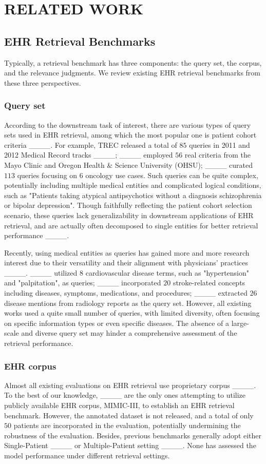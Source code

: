 \section{RELATED WORK}
\subsection{EHR Retrieval Benchmarks}
Typically, a retrieval benchmark has three components: the query set, the corpus, and the relevance judgments.
We review existing EHR retrieval benchmarks from these three perspectives.

\subsubsection{Query set}
According to the downstream task of interest, there are various types of query sets used in EHR retrieval, among which the most popular one is patient cohort criteria ____.
For example, TREC released a total of $85$ queries in 2011 and 2012 Medical Record tracks ____; 
____ employed $56$ real criteria from the Mayo Clinic and Oregon Health \& Science University (OHSU); 
____ curated $113$ queries focusing on $6$ oncology use cases.
Such queries can be quite complex, potentially including multiple medical entities and complicated logical conditions, such as "Patients taking atypical antipsychotics without a diagnosis schizophrenia or bipolar depression".
Though faithfully reflecting the patient cohort selection scenario, these queries lack generalizability in downstream applications of EHR retrieval, and are actually often decomposed to single entities for better retrieval performance ____.

Recently, using medical entities as queries has gained more and more research interest due to their versatility and their alignment with physicians' practices ____.
____ utilized $8$ cardiovascular disease terms, such as "hypertension" and "palpitation", as queries;
____ incorporated $20$ stroke-related concepts including diseases, symptoms, medications, and procedures; ____ extracted $26$ disease mentions from radiology reports as the query set. 
However, all existing works used a quite small number of queries, with limited diversity, often focusing on specific information types or even specific diseases. 
The absence of a large-scale and diverse query set may hinder a comprehensive assessment of the retrieval performance.

\subsubsection{EHR corpus}
Almost all existing evaluations on EHR retrieval use proprietary corpus ____.
To the best of our knowledge, ____ are the only ones attempting to utilize publicly available EHR corpus, MIMIC-III, to establish an EHR retrieval benchmark.
However, the annotated dataset is not released, and a total of only $50$ patients are incorporated in the evaluation, potentially undermining the robustness of the evaluation.
Besides, previous benchmarks generally adopt either Single-Patient ____ or Multiple-Patient setting ____.
None has assessed the model performance under different retrieval settings.

